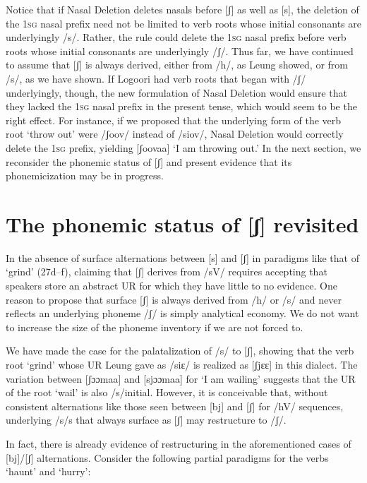 \documentclass[output=paper]{langsci/langscibook}
\begin{document}
Notice that if Nasal Deletion deletes nasals before [ʃ] as well as [s], the deletion of the 1\textsc{sg} nasal prefix need not be limited to verb roots whose initial consonants are underlyingly /s/. Rather, the rule could delete the 1\textsc{sg} nasal prefix before verb roots whose initial consonants are underlyingly /ʃ/. Thus far, we have continued to assume that [ʃ] is always derived, either from /h/, as Leung showed, or from /s/, as we have shown. If Logoori had verb roots that began with /ʃ/ underlyingly, though, the new formulation of Nasal Deletion would ensure that they lacked the 1\textsc{sg} nasal prefix in the present tense, which would seem to be the right effect. For instance, if we proposed that the underlying form of the verb root ‘throw out’ were /ʃoov/ instead of /siov/, Nasal Deletion would correctly delete the 1\textsc{sg} prefix, yielding [ʃoovaa] ‘I am throwing out.’ In the next section, we reconsider the phonemic status of [ʃ] and present evidence that its phonemicization may be in progress.

\section{The phonemic status of [ʃ] revisited}

In the absence of surface alternations between [s] and [ʃ] in paradigms like that of ‘grind’ (27d–f), claiming that [ʃ] derives from /sV/ requires accepting that speakers store an abstract UR for which they have little to no evidence. One reason to propose that surface [ʃ] is always derived from /h/ or /s/ and never reflects an underlying phoneme /ʃ/ is simply analytical economy. We do not want to increase the size of the phoneme inventory if we are not forced to.

We have made the case for the palatalization of /s/ to [ʃ], showing that the verb root ‘grind’ whose UR Leung gave as /siɛ/ is realized as [ʃjɛɛ] in this dialect. The variation between [ʃɔɔmaa] and [sjɔɔmaa] for ‘I am wailing’ suggests that the UR of the root ‘wail’ is also /s/initial. However, it is conceivable that, without consistent alternations like those seen between [bj] and [ʃ] for /hV/ sequences, underlying /s/s that always surface as [ʃ] may restructure to /ʃ/. 

In fact, there is already evidence of restructuring in the aforementioned cases of [bj]/[ʃ] alternations. Consider the following partial paradigms for the verbs ‘haunt’ and ‘hurry’:
\end{document}

